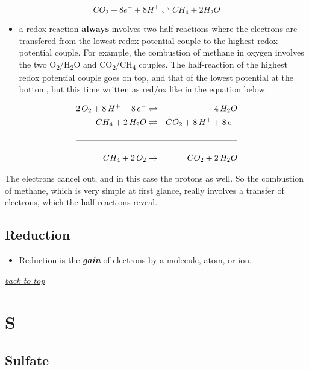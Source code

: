 \documentclass[]{book}
\providecommand{\tightlist}{%
  \setlength{\itemsep}{0pt}\setlength{\parskip}{0pt}}
\theoremstyle{definition}
\theoremstyle{definition}
\theoremstyle{definition}
\theoremstyle{remark}
\begin{document}
\begin{equation}
CO_2 + 8 e^- + 8 H^+ \rightleftharpoons CH_4 + 2 H_2O
\end{equation}

\begin{itemize}
\tightlist
\item
  a redox reaction \textbf{always} involves two half reactions where the
  electrons are transfered from the lowest redox potential couple to the
  highest redox potential couple. For example, the combustion of methane
  in oxygen involves the two O\textsubscript{2}/H\textsubscript{2}O and
  CO\textsubscript{2}/CH\textsubscript{4} couples. The half-reaction of
  the highest redox potential couple goes on top, and that of the lowest
  potential at the bottom, but this time written as red/ox like in the
  equation below:
\end{itemize}

\begin{align}
2\,O_2 + 8\,H^+ + 8\,e^- & \rightleftharpoons & 4\,H_2O\\
CH_4 + 2\,H_2O & \rightleftharpoons & CO_2 + 8\,H^+ + 8\,e^-\\
& &\\
\hline\\
CH_4 + 2\,O_2 & \to & CO_2 + 2\,H_2O
\end{align}

The electrons cancel out, and in this case the protons as well. So the
combustion of methane, which is very simple at first glance, really
involves a transfer of electrons, which the half-reactions reveal.

\hypertarget{reduction}{\subsection{Reduction}\label{reduction}}

\begin{itemize}
\tightlist
\item
  Reduction is the \emph{\textbf{gain}} of electrons by a molecule,
  atom, or ion.
\end{itemize}

\emph{\protect\hyperlink{top}{back to top}}

\section{S}\label{s}

\subsection{Sulfate}\label{sulfate}
\end{document}
